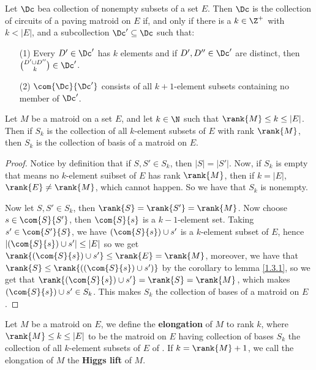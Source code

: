 \begin{theorem}\label{1.3.6}
    Let $\Dc$ bea collection of nonempty subsets of a set $E$. Then  $\Dc$ is
    the collection of circuits of a paving matroid on  $E$ if, and only if there
    is a  $k \in \Z^+$ with  $k<|E|$, and a subcollection  $\Dc' \subseteq \Dc$
    such that:
    \begin{enumerate}
        \item[(1)] Every $D' \in \Dc'$ has  $k$ elements and if  $D',D'' \in
            \Dc'$ are distinct, then ${D' \cup D'' \choose k} \in \Dc'$.

        \item[(2)] $\com{\Dc}{\Dc'}$ consists of all $k+1$-element subsets
            containing no member of  $\Dc'$.
    \end{enumerate}
\end{theorem}

\begin{lemma}[Brylawski]\label{1.3.6}
    Let $M$ be a matroid on a set  $E$, and let  $k \in \N$ such that  $\rank{M}
    \leq k \leq |E|$. Then if $S_k$ is the collection of all  $k$-element
    subsets of  $E$ with rank  $\rank{M}$, then $S_k$ is the collection of basis
    of a matroid on $E$.
\end{lemma}
\begin{proof}
    Notice by definition that if $S,S' \in S_k$, then  $|S|=|S'|$. Now, if
    $S_k$ is empty that means no  $k$-element suibset of  $E$ has rank
    $\rank{M}$, then if $k=|E|$,  $\rank{E} \neq \rank{M}$, which cannot happen.
    So we have that $S_k$ is nonempty.

    Now let  $S,S' \in S_k$, then  $ \rank{S}=\rank{S'}=\rank{M}$. Now choose $s
    \in \com{S}{S'}$, then $\com{S}{s}$ is a $k-1$-element set. Taking $s' \in
    \com{S'}{S}$, we have $(\com{S}{s}) \cup s'$ is a $k$-element subset of
    $E$, hence $|(\com{S}{s}) \cup s'| \leq |E|$  so we get $\rank{(\com{S}{s})
    \cup s'} \leq \rank{E}=\rank{M}$, moreover, we have that $\rank{S} \leq
    \rank{((\com{S}{s}) \cup s')}$ by the corollary to lemma \ref{1.3.1}, so we
    get that $\rank{(\com{S}{s}) \cup s'}=\rank{S}=\rank{M}$, which makes
    $(\com{S}{s}) \cup s' \in S_k$. This makes $S_k$ the collection of bases of
    a matroid on  $E$.
\end{proof}

\begin{definition}
    Let $M$ be a matroid on  $E$, we define the  \textbf{elongation} of $M$ to
    rank  $k$, where  $\rank{M} \leq k \leq |E|$ to be the matroid on $E$ having
    collection of bases $S_k$ the collection of all $k$-element subsets of  $E$
    of . If $k=\rank{M}+1$, we call the elongation of $M$ the
    \textbf{Higgs lift} of $M$.
\end{definition}

